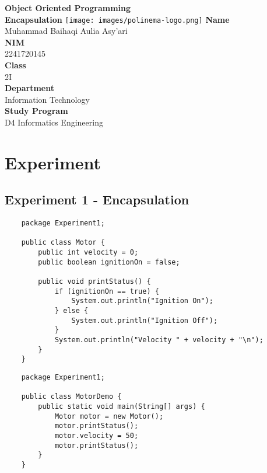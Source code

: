 \documentclass[12pt,titlepage]{article}
\newcommand{\vSubject}{Object Oriented Programming}
\newcommand{\vSubtitle}{Encapsulation}
\newcommand{\vName}{Muhammad Baihaqi Aulia Asy'ari}
\newcommand{\vNIM}{2241720145}
\newcommand{\vClass}{2I}
\newcommand{\vDepartment}{Information Technology}
\newcommand{\vStudyProgram}{D4 Informatics Engineering}
\begin{document}
\begin{titlepage}
    \centering
    \vfill
    {\bfseries\LARGE
        \vSubject\\
        \vskip0.25cm
        \vSubtitle
    }
    \vfill
    \texttt{[image: images/polinema-logo.png]}
    \vfill
    {
        \textbf{Name}\\
        \vName\\
        \vskip0.5cm
        \textbf{NIM}\\
        \vNIM\\
        \vskip0.5cm
        \textbf{Class}\\
        \vClass\\
        \vskip0.5cm
        \textbf{Department}\\
        \vDepartment\\
        \vskip0.5cm
        \textbf{Study Program}\\
        \vStudyProgram
    }
\end{titlepage}

\newpage

\setcounter{section}{2}
\section{Experiment}
\subsection{Experiment 1 - Encapsulation}

\begin{verbatim}
    package Experiment1;

    public class Motor {
        public int velocity = 0;
        public boolean ignitionOn = false;

        public void printStatus() {
            if (ignitionOn == true) {
                System.out.println("Ignition On");
            } else {
                System.out.println("Ignition Off");
            }
            System.out.println("Velocity " + velocity + "\n");
        }
    }
\end{verbatim}

\begin{verbatim}
    package Experiment1;

    public class MotorDemo {
        public static void main(String[] args) {
            Motor motor = new Motor();
            motor.printStatus();
            motor.velocity = 50;
            motor.printStatus();
        }
    }
\end{verbatim}
\end{document}
